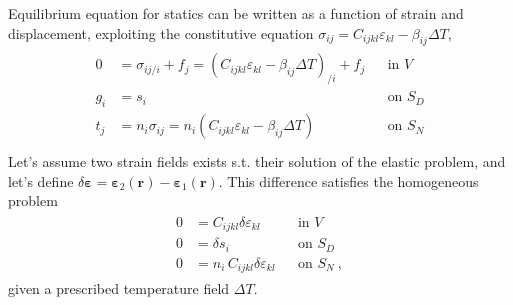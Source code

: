 \documentclass[letterpaper,10pt,english]{jupyterBook}
\begin{document}
\sphinxAtStartPar
Equilibrium equation for statics can be written as a function of strain and displacement, exploiting the constitutive equation \(\sigma_{ij} = C_{ijkl} \varepsilon_{kl} - \beta_{ij} \Delta T\),
\begin{equation*}
\begin{split}\begin{aligned}
  0   & = \sigma_{ij/i} + f_j = \left( C_{ijkl} \varepsilon_{kl} - \beta_{ij} \Delta T \right)_{/i} + f_j && \text{in $V$} \\
  g_i & = s_i             && \text{on $S_D$} \\
  t_j & = n_i \sigma_{ij} = n_i ( C_{ijkl} \varepsilon_{kl} - \beta_{ij} \Delta T ) && \text{on $S_N$} \\
\end{aligned}\end{split}
\end{equation*}
\sphinxAtStartPar
Let’s assume two strain fields exists s.t. their solution of the elastic problem, and let’s define \(\delta \boldsymbol\varepsilon = \boldsymbol\varepsilon_2(\mathbf{r}) - \boldsymbol\varepsilon_1(\mathbf{r})\). This difference satisfies the homogeneous problem
\begin{equation*}
\begin{split}\begin{aligned}
  0   & = C_{ijkl} \delta \varepsilon_{kl}        && \text{in $V$} \\
  0   & = \delta s_i                              && \text{on $S_D$} \\
  0   & = n_i \, C_{ijkl} \delta \varepsilon_{kl} && \text{on $S_N$} \ ,
\end{aligned}\end{split}
\end{equation*}
\sphinxAtStartPar
given a prescribed temperature field \(\Delta T\).
\end{document}
